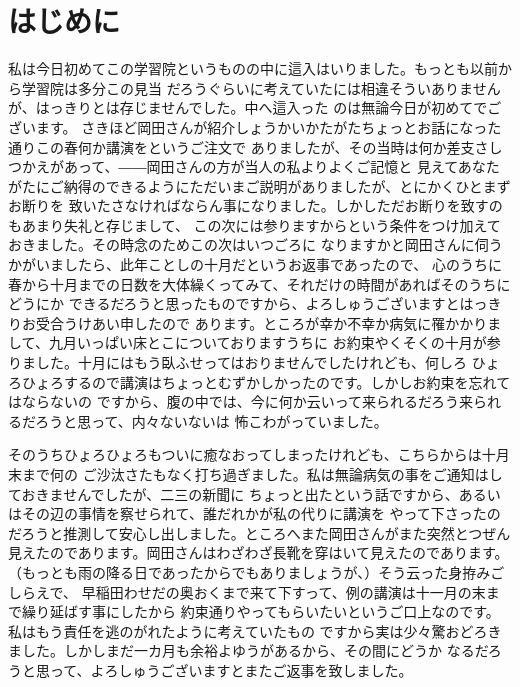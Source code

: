 \chapter{はじめに}
私は今日初めてこの学習院というものの中に這入はいりました。もっとも以前から学習院は多分この見当
だろうぐらいに考えていたには相違そういありませんが、はっきりとは存じませんでした。中へ這入った
のは無論今日が初めてでございます。
さきほど岡田さんが紹介しょうかいかたがたちょっとお話になった通りこの春何か講演をというご注文で
ありましたが、その当時は何か差支さしつかえがあって、――岡田さんの方が当人の私よりよくご記憶と
見えてあなたがたにご納得のできるようにただいまご説明がありましたが、とにかくひとまずお断りを
致いたさなければならん事になりました。しかしただお断りを致すのもあまり失礼と存じまして、
この次には参りますからという条件をつけ加えておきました。その時念のためこの次はいつごろに
なりますかと岡田さんに伺うかがいましたら、此年ことしの十月だというお返事であったので、
心のうちに春から十月までの日数を大体繰くってみて、それだけの時間があればそのうちにどうにか
できるだろうと思ったものですから、よろしゅうございますとはっきりお受合うけあい申したので
あります。ところが幸か不幸か病気に罹かかりまして、九月いっぱい床とこについておりますうちに
お約束やくそくの十月が参りました。十月にはもう臥ふせってはおりませんでしたけれども、何しろ
ひょろひょろするので講演はちょっとむずかしかったのです。しかしお約束を忘れてはならないの
ですから、腹の中では、今に何か云いって来られるだろう来られるだろうと思って、内々ないないは
怖こわがっていました。

そのうちひょろひょろもついに癒なおってしまったけれども、こちらからは十月末まで何の
ご沙汰さたもなく打ち過ぎました。私は無論病気の事をご通知はしておきませんでしたが、二三の新聞に
ちょっと出たという話ですから、あるいはその辺の事情を察せられて、誰だれかが私の代りに講演を
やって下さったのだろうと推測して安心し出しました。ところへまた岡田さんがまた突然とつぜん
見えたのであります。岡田さんはわざわざ長靴を穿はいて見えたのであります。
（もっとも雨の降る日であったからでもありましょうが、）そう云った身拵みごしらえで、
早稲田わせだの奥おくまで来て下すって、例の講演は十一月の末まで繰り延ばす事にしたから
約束通りやってもらいたいというご口上なのです。私はもう責任を逃のがれたように考えていたもの
ですから実は少々驚おどろきました。しかしまだ一カ月も余裕よゆうがあるから、その間にどうか
なるだろうと思って、よろしゅうございますとまたご返事を致しました。


